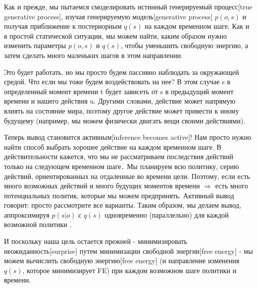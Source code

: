 \documentclass[twoside,leqno, 11pt]{article}
\begin{document}
	
	Как и прежде, мы пытаемся смоделировать истинный генерируемый процесс[true generative process], изучая генерируемую модель[generative process] $p(o,s)$ и получая приближение к постериорным $q(s)$ на каждом временном шаге. Как и в простой статической ситуации, мы можем найти, каким образом нужно изменить параметры $p(o,s)$ и $q(s)$, чтобы уменьшить свободную энергию, а затем сделать много маленьких шагов в этом направлении.


	Это будет работать, но мы просто будем пассивно наблюдать за окружающей средой. Что если мы тоже будем воздействовать на нее? В этом случае s в определенный момент времени t будет зависеть от s в предыдущий момент времени и нашего действия u. Другими словами, действие может напрямую влиять на состояние мира, поэтому другое действие может привести к иному будущему (например, мы можем физически двигать вещи своими действиями).


	Теперь вывод становится активным[inference becomes active]! Нам просто нужно найти способ выбрать хорошее действие на каждом временном шаге. В действительности кажется, что мы не рассматриваем последствия действий только на следующем временном шаге․ Мы планируем всю политику, серию действий, ориентированных на отдаленные во времени цели. Поэтому, если есть много возможных действий и много будущих моментов времени $\Rightarrow$ есть много потенциальных политик, которые мы можем предпринять. Активный вывод говорит: просто рассмотрите все варианты. Таким образом, мы делаем вывод, аппроксимируя $p(s|o)$ с $q(s)$ одновременно (параллельно) для каждой возможной политики \pi.


	И поскольку наша цель остается прежней - минимизировать неожиданность[surprise] путем минимизации свободной энергии[free energy] - мы можем вычислить свободную энергию[free energy] (и направление изменения $q(s)$, которое минимизирует FE) при каждом возможном шаге политики и времени.
	
\end{document}
